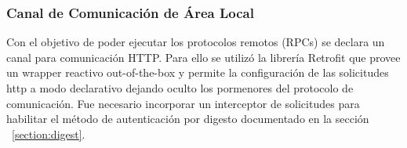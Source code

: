 \subsubsection{Canal de Comunicación de Área Local}
Con el objetivo de poder ejecutar los protocolos remotos (RPCs) se declara un canal para comunicación HTTP.
Para ello se utilizó la librería Retrofit que provee un wrapper reactivo out-of-the-box y permite la configuración de las
solicitudes http a modo declarativo dejando oculto los pormenores del protocolo de comunicación.
Fue necesario incorporar un interceptor de solicitudes para habilitar el método de autenticación por digesto documentado en la sección ~\ref{section:digest}.